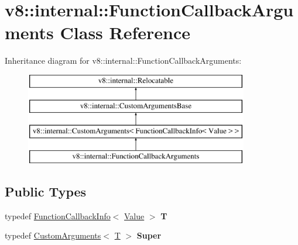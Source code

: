 \hypertarget{classv8_1_1internal_1_1FunctionCallbackArguments}{}\section{v8\+:\+:internal\+:\+:Function\+Callback\+Arguments Class Reference}
\label{classv8_1_1internal_1_1FunctionCallbackArguments}
Inheritance diagram for v8\+:\+:internal\+:\+:Function\+Callback\+Arguments\+:\begin{figure}[H]
\begin{center}
\leavevmode
\includegraphics[height=4.000000cm]{classv8_1_1internal_1_1FunctionCallbackArguments}
\end{center}
\end{figure}
\subsection*{Public Types}
\begin{DoxyCompactItemize}
\item 
\mbox{\label{classv8_1_1internal_1_1FunctionCallbackArguments_a890c9aefecb1702b70b70b2f8dd9aa48}} 
typedef \mbox{\hyperlink{classv8_1_1FunctionCallbackInfo}{Function\+Callback\+Info}}$<$ \mbox{\hyperlink{classv8_1_1Value}{Value}} $>$ {\bfseries T}
\item 
\mbox{\label{classv8_1_1internal_1_1FunctionCallbackArguments_a9f38caba6a1d9692f7244e8f69f72a11}} 
typedef \mbox{\hyperlink{classv8_1_1internal_1_1CustomArguments}{Custom\+Arguments}}$<$ \mbox{\hyperlink{classv8_1_1FunctionCallbackInfo}{T}} $>$ {\bfseries Super}
\end{DoxyCompactItemize}
